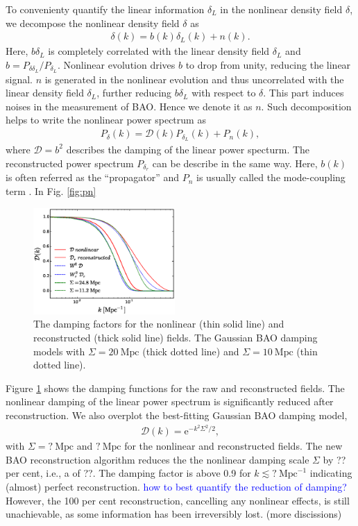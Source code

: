 \documentclass[aps,prd,twocolumn,showpacs,superscriptaddress,groupedaddress,nofootinbib]{revtex4}  %
\newcommand{\mr}{\mathrm}
\newcommand{\tcb}{\textcolor{blue}}
\newcommand{\bea}{\begin{eqnarray}}
\newcommand{\eea}{\end{eqnarray}}
\begin{document}
To convenienty quantify the linear information $\delta_L$ in 
the nonlinear density field $\delta$, we decompose the nonlinear density field
$\delta$ as
\begin{eqnarray}
\delta({k})=b({k})\delta_L({k})+n({k}).
\end{eqnarray}
Here, $b\delta_L$ is completely correlated with the linear density field 
$\delta_L$ and $b=P_{\delta\delta_L}/P_{\delta_L}$.
Nonlinear evolution drives $b$ to drop from unity, reducing the linear signal.
$n$ is generated in the nonlinear evolution and thus uncorrelated with
the linear density field $\delta_L$, further reducing $b\delta_L$ with respect
to $\delta$. This part induces noises in the measurement of BAO. 
Hence we denote it as $n$. 
Such decomposition helps to write the nonlinear power spectrum as
\bea
P_\delta(k)=\mathcal{D}(k)P_{\delta_L}(k)+P_{n}(k),
\eea
where $\mathcal{D}=b^2$ describes the damping of the linear power specturm.
The reconstructed power spectrum $P_{\delta_r}$ can be describe in the 
same way.
Here, $b(k)$ is often referred as the ``propagator'' 
and $P_{n}$ is usually
called the mode-coupling term \cite{2006crocce,2008crocce,2008matsubara}.
In Fig. \ref{fig:pn}


\begin{figure}[tbp]
\begin{center}
\includegraphics[width=0.48\textwidth]{f6x.eps}
\end{center}
\vspace{-0.7cm}
\caption{The damping factors for the nonlinear (thin solid line) and 
reconstructed (thick solid line) fields. The Gaussian BAO damping models with 
$\Sigma=20\ \mr{Mpc}$ (thick dotted line) and $\Sigma=10\ \mr{Mpc}$ (thin dotted
line).}
\label{fig:damp}
\end{figure}

Figure \ref{fig:damp} shows the damping functions for the raw and reconstructed 
fields. The nonlinear damping of the linear power spectrum is 
significantly reduced after reconstruction. We also overplot the best-fitting 
Gaussian BAO damping model,
\bea
\mathcal{D}(k)=\mr{e}^{-k^2\Sigma^2/2},
\eea
with $\Sigma=?\ \mr{Mpc}$ and $?\ \mr{Mpc}$ for the nonlinear and reconstructed 
fields. The new BAO reconstruction algorithm reduces the the nonlinear damping
scale $\Sigma$ by ?? per cent, i.e., a of ??. The damping factor is above 0.9
for $k\lesssim?\ \mr{Mpc}^{-1}$ indicating (almost) perfect reconstruction. 
\tcb{how to best quantify the reduction of damping? }
However, the 100 per cent reconstruction, cancelling any nonlinear effects,
is still unachievable, as some information has been irreversibly lost. (more 
discissions)
\end{document}
